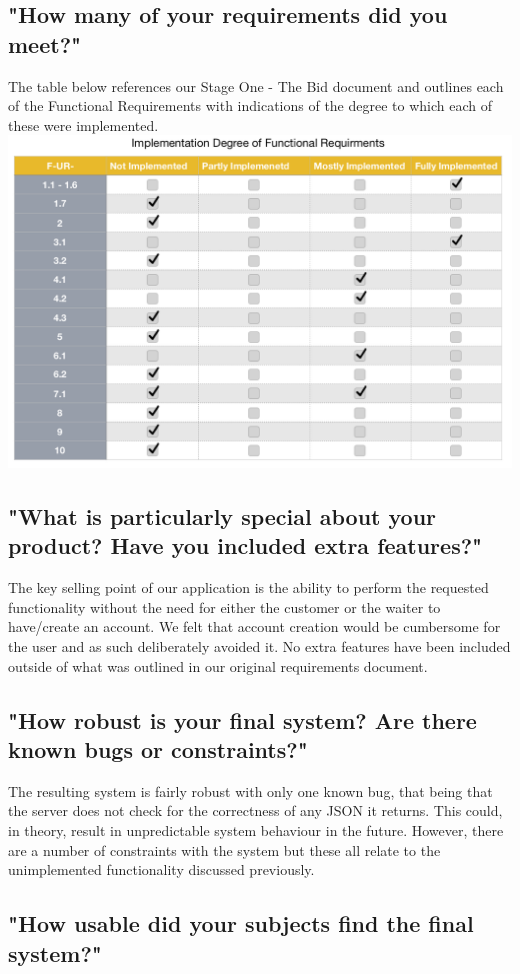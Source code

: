 \documentclass[11pt, oneside, a4paper]{report}   %
\begin{document}
\subsection{"How many of your requirements did you meet?"}
The table below references our Stage One - The Bid document and outlines each of the Functional Requirements with indications of the degree to which each of these were implemented.\\

\includegraphics[width=\textwidth]{FR}

\subsection{"What is particularly special about your product? Have you included extra features?"}
The key selling point of our application is the ability to perform the requested functionality without the need for either the customer or the waiter to have/create an account. We felt that account creation would be cumbersome for the user and as such deliberately avoided it. No extra features have been included outside of what was outlined in our original requirements document. 
\subsection{"How robust is your final system? Are there known bugs or constraints?"}

The resulting system is fairly robust with only one known bug, that being that the server does not check for the correctness of any JSON it returns. This could, in theory, result in unpredictable system behaviour in the future. However, there are a number of constraints with the system but these all relate to the unimplemented functionality discussed previously.
\subsection{"How usable did your subjects find the final system?"}
\end{document}
